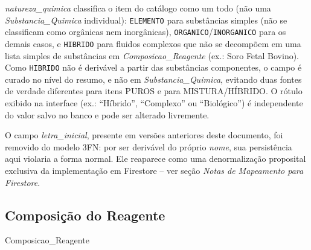 \begin{explicacao}
\textit{natureza\_quimica} classifica o item do catálogo como um todo (não uma \textit{Substancia\_Quimica} individual): \texttt{ELEMENTO} para substâncias simples (não se classificam como orgânicas nem inorgânicas), \texttt{ORGANICO}/\texttt{INORGANICO} para os demais casos, e \texttt{HIBRIDO} para fluidos complexos que não se decompõem em uma lista simples de substâncias em \textit{Composicao\_Reagente} (ex.: Soro Fetal Bovino). Como \texttt{HIBRIDO} não é derivável a partir das substâncias componentes, o campo é curado no nível do resumo, e não em \textit{Substancia\_Quimica}, evitando duas fontes de verdade diferentes para itens PUROS e para MISTURA/HÍBRIDO. O rótulo exibido na interface (ex.: ``Híbrido'', ``Complexo'' ou ``Biológico'') é independente do valor salvo no banco e pode ser alterado livremente.

O campo \textit{letra\_inicial}, presente em versões anteriores deste documento, foi removido do modelo 3FN: por ser derivável do próprio \textit{nome}, sua persistência aqui violaria a forma normal. Ele reaparece como uma denormalização proposital exclusiva da implementação em Firestore -- ver seção \textit{Notas de Mapeamento para Firestore}.
\end{explicacao}
\newpage
\subsection{Composição do Reagente}
\begin{entidade}{Composicao\_Reagente}
\end{entidade}

